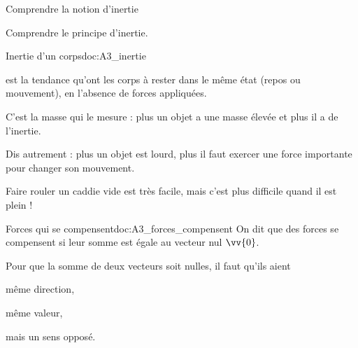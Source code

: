 \teteSndMouv


\vspace*{-32pt}


\begin{objectifs}
  \item Comprendre la notion d'inertie
  \item Comprendre le principe d'inertie.
\end{objectifs}


\begin{doc}{Inertie d'un corps}{doc:A3_inertie}
  \begin{importants}
     est la tendance qu'ont les corps à rester dans le même état (repos ou mouvement), en l'absence de forces appliquées.
  \end{importants}
    
  \fleche C'est la masse qui le mesure : plus un objet a une masse élevée et plus il a de l'inertie.
  
  \fleche Dis autrement : plus un objet est lourd, plus il faut exercer une force importante pour changer son mouvement.
  
  \exemple Faire rouler un caddie vide est très facile, mais c'est plus difficile quand il est plein !
\end{doc}


\begin{doc}{Forces qui se compensent}{doc:A3_forces_compensent}
  On dit que des forces se compensent si leur somme est égale au vecteur nul $\vv{0}$.

  Pour que la somme de deux vecteurs soit nulles, il faut qu'ils aient 
  \begin{listePoints}
    \item même direction,
    \item même valeur,
    \item mais un sens opposé.
  \end{listePoints}

  \centering
\end{doc}





